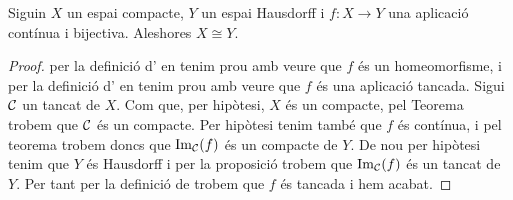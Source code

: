 \documentclass[../Apunts.tex]{subfiles}
\begin{document}
	\begin{theorem}
		Siguin \(X\) un espai compacte, \(Y\) un espai Hausdorff i \(f\colon X\longrightarrow Y\) una aplicació contínua i bijectiva. Aleshores \(X\cong Y\).
		\begin{proof}
			per la definició d' en tenim prou amb veure que \(f\) és un homeomorfisme, i per la definició d' en tenim prou amb veure que \(f\) és una aplicació tancada. Sigui \(\mathcal{C}\) un tancat de \(X\). Com que, per hipòtesi, \(X\) és un compacte, pel Teorema  trobem que \(\mathcal{C}\) és un compacte. Per hipòtesi tenim també que \(f\) és contínua, i pel teorema  trobem doncs que \(\operatorname{Im}_{\mathcal{C}}(f)\) és un compacte de \(Y\). De nou per hipòtesi tenim que \(Y\) és Hausdorff i per la proposició  trobem que \(\operatorname{Im}_{\mathcal{C}}(f)\) és un tancat de \(Y\). Per tant per la definició de  trobem que \(f\) és tancada i hem acabat.
		\end{proof}
	\end{theorem}
\end{document}
